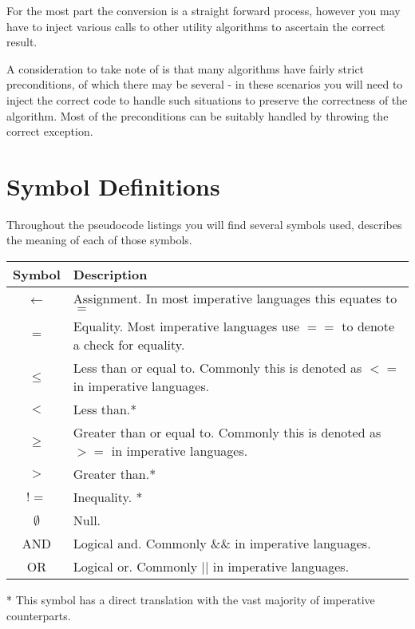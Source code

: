 \documentclass[10pt,oneside,a4paper]{report}
\begin{document}
For the most part the conversion is a straight forward process, however you may have to inject various calls to other utility algorithms to ascertain the correct result.

A consideration to take note of is that many algorithms have fairly strict preconditions, of which there may be several - in these scenarios you will need to inject the correct code to handle such situations to preserve the correctness of the algorithm. Most of the preconditions can be suitably handled by throwing the correct exception.

\chapter{Symbol Definitions}
Throughout the pseudocode listings you will find several symbols used,  describes the meaning of each of those symbols.

\begin{tabular}[t]{|c|l|}
\hline
\textbf{Symbol} & \textbf{Description} \\
\hline
$\leftarrow$ & Assignment. In most imperative languages this equates to $=$ \\
\hline
$=$ & Equality. Most imperative languages use $==$ to denote a check for equality. \\
\hline
$\leq$ & Less than or equal to. Commonly this is denoted as $<=$ in imperative languages. \\
\hline
$<$ & Less than.* \\
\hline
$\geq$ & Greater than or equal to. Commonly this is denoted as $>=$ in imperative languages. \\
\hline
$>$ & Greater than.* \\
\hline
$!=$ & Inequality. * \\
\hline
$\emptyset$ & Null. \\
\hline
AND & Logical and. Commonly \&\& in imperative languages. \\
\hline
OR & Logical or. Commonly || in imperative languages. \\ %
\hline
\end{tabular}

* This symbol has a direct translation with the vast majority of imperative counterparts.
\end{document}
